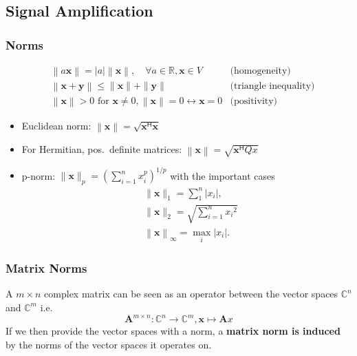 \subsection{Signal Amplification}

\subsubsection{Norms}

\begin{align*}
     & \left\| a\mathbf{x}\right\|  =\left|a\right|\left\|\mathbf{x}\right\|,\quad\forall a\in\mathbb{R},\mathbf{x}\in V                 & \text{(homogeneity)}          \\
     & \left\|\mathbf{x}+\mathbf{y}\right\|                         \leq\|\mathbf{x}\|+\|\mathbf{y}\|                                    & \text{(triangle inequality)} \\
     & \left\|\mathbf{x}\right\|                >0 \text{ for } \mathbf{x}\neq0, \left\|\mathbf{x}\right\|=0\leftrightarrow \mathbf{x}=0 & \text{(positivity)}
\end{align*}

\begin{itemize}
    \item Euclidean norm: $\left\|\mathbf{x}\right\|=\sqrt{\mathbf{x}^{\mathsf{H}}\mathbf{x}}$
    \item For Hermitian, pos.\ definite matrices: $\left\|\mathbf{x}\right\|=\sqrt{\mathbf{x}^{\mathsf{H}} Qx}$
    \item p-norm: $\|\mathbf{x}\|_p{=\left(\sum_{i=1}^n x_i^p\right)}^{1/p}$ with the important cases
          \begin{align*}
               & \|\mathbf{x}\|_1=\sum_1^n\left|x_i\right|,               \\
               & \|\mathbf{x}\|_2=\sqrt{\sum_{i=1}^n {x_i}^2}             \\
               & \left\|\mathbf{x}\right\|_\infty=\max_i\left|x_i\right|.
          \end{align*}
\end{itemize}

\subsubsection{Matrix Norms}
A $m\times n$ complex matrix can be seen as an operator between the vector spaces $\mathbb{C}^n$ and $\mathbb{C}^m$ i.e.
\begin{equation*}
    \mathbf{A}^{m\times n}:\mathbb{C}^n\to\mathbb{C}^m,\mathbf{x}\mapsto \mathbf{A}x
\end{equation*}
If we then provide the vector spaces with a norm, a \textbf{matrix norm is induced} by the norms of the vector spaces it operates on.

